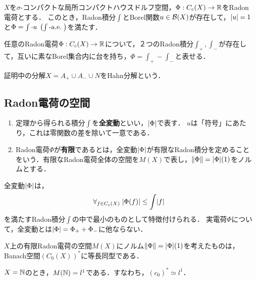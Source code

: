 \documentclass[uplatex,dvipdfmx]{jsreport}
\begin{document}
\begin{theorem}
    $X$を$\sigma$-コンパクトな局所コンパクトハウスドルフ空間，$\Phi:C_c(X)\to\mathbb{R}$をRadon電荷とする．
    このとき，Radon積分$\int$とBorel関数$u\in\mathcal{B}(X)$が存在して，$\lvert u\rvert=1$と$\Phi=\int\cdot u\;\left(\int\text{-}\mathrm{a.e.}\;\right)$を満たす．
\end{theorem}

\begin{corollary}
    任意のRadon電荷$\Phi:C_c(X)\to\mathbb{R}$について，２つのRadon積分$\int_+,\int_-$が存在して，互いに素なBorel集合内に台を持ち，$\Phi=\int_+-\int_-$と表せる．
\end{corollary}
\begin{remarks}
    証明中の分解$X=A_+\cup A_-\cup N$をHahn分解という．
\end{remarks}

\subsection{Radon電荷の空間}

\begin{definition}\mbox{}
    \begin{enumerate}
        \item 定理から得られる積分$\int$を\textbf{全変動}といい，$\lvert\Phi\rvert$で表す．
        $u$は「符号」にあたり，これは零関数の差を除いて一意である．
        \item Radon電荷$\Phi$が\textbf{有限}であるとは，全変動$\lvert\Phi\rvert$が有限なRadon積分を定めることをいう．有限なRadon電荷全体の空間を$M(X)$で表し，$\|\Phi\|=\lvert\Phi\rvert(1)$をノルムとする．
    \end{enumerate}
\end{definition}
\begin{remark}
    全変動$\lvert\Phi\rvert$は，
    \[\forall_{f\in C_c(X)}\;\lvert\Phi(f)\rvert\le\int\lvert f\rvert\]
    を満たすRadon積分$\int$の中で最小のものとして特徴付けられる．
    実電荷$\Phi$について，全変動とは$\lvert\Phi\rvert=\Phi_++\Phi_-$に他ならない．
\end{remark}

\begin{proposition}\label{prop-Riesz-Markov-3}
    $X$上の有限Radon電荷の空間$M(X)$にノルム$\|\Phi\|=\lvert\Phi\rvert(1)$を考えたものは，Banach空間$(C_0(X))^*$に等長同型である．
\end{proposition}

\begin{example}\label{exp-Riesz-Markov-theorem-to-sequence-spaces}
    $X=\mathbb{N}$のとき，$M(\mathbb{N})=l^1$である．すなわち，$(c_0)^*\simeq l^1$．
\end{example}
\end{document}

